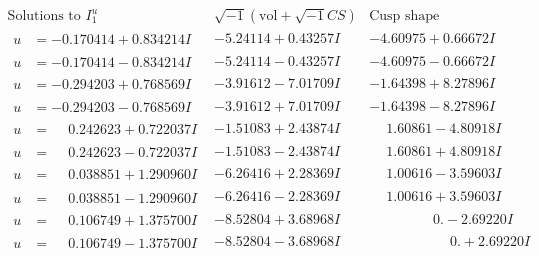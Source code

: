\documentclass[1p]{elsarticle_modified}
\theoremstyle{definition}
\newcommand{\I}{\sqrt{-1}}
\begin{document}
$$\begin{array}{c|c|c}  
\text{Solutions to }I^u_{1}& \I (\text{vol} + \sqrt{-1}CS) & \text{Cusp shape}\\
 \hline 
\begin{aligned}
u &= -0.170414 + 0.834214 I\end{aligned}
 & -5.24114 + 0.43257 I & -4.60975 + 0.66672 I \\ \hline\begin{aligned}
u &= -0.170414 - 0.834214 I\end{aligned}
 & -5.24114 - 0.43257 I & -4.60975 - 0.66672 I \\ \hline\begin{aligned}
u &= -0.294203 + 0.768569 I\end{aligned}
 & -3.91612 - 7.01709 I & -1.64398 + 8.27896 I \\ \hline\begin{aligned}
u &= -0.294203 - 0.768569 I\end{aligned}
 & -3.91612 + 7.01709 I & -1.64398 - 8.27896 I \\ \hline\begin{aligned}
u &= \phantom{-}0.242623 + 0.722037 I\end{aligned}
 & -1.51083 + 2.43874 I & \phantom{-}1.60861 - 4.80918 I \\ \hline\begin{aligned}
u &= \phantom{-}0.242623 - 0.722037 I\end{aligned}
 & -1.51083 - 2.43874 I & \phantom{-}1.60861 + 4.80918 I \\ \hline\begin{aligned}
u &= \phantom{-}0.038851 + 1.290960 I\end{aligned}
 & -6.26416 + 2.28369 I & \phantom{-}1.00616 - 3.59603 I \\ \hline\begin{aligned}
u &= \phantom{-}0.038851 - 1.290960 I\end{aligned}
 & -6.26416 - 2.28369 I & \phantom{-}1.00616 + 3.59603 I \\ \hline\begin{aligned}
u &= \phantom{-}0.106749 + 1.375700 I\end{aligned}
 & -8.52804 + 3.68968 I & \phantom{-0.000000 } 0. - 2.69220 I \\ \hline\begin{aligned}
u &= \phantom{-}0.106749 - 1.375700 I\end{aligned}
 & -8.52804 - 3.68968 I & \phantom{-0.000000 -}0. + 2.69220 I \\ \hline\begin{aligned}

\end{aligned}
\end{array}$$
\end{document}
